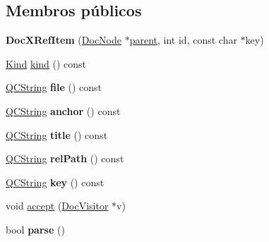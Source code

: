 \subsection*{Membros públicos}
\begin{DoxyCompactItemize}
\item 
\hypertarget{class_doc_x_ref_item_a96fb92409830e0b3557d44ecea952457}{{\bfseries Doc\-X\-Ref\-Item} (\hyperlink{class_doc_node}{Doc\-Node} $\ast$\hyperlink{class_doc_node_abd7f070d6b0a38b4da71c2806578d19d}{parent}, int id, const char $\ast$key)}\label{class_doc_x_ref_item_a96fb92409830e0b3557d44ecea952457}

\item 
\hyperlink{class_doc_node_aa10c9e8951b8ccf714a59ec321bdac5b}{Kind} \hyperlink{class_doc_x_ref_item_aa9d037bed9f9a083d0cd01485637d843}{kind} () const 
\item 
\hypertarget{class_doc_x_ref_item_aeaa8cdb0fbabc1058b7d3813f2fd223b}{\hyperlink{class_q_c_string}{Q\-C\-String} {\bfseries file} () const }\label{class_doc_x_ref_item_aeaa8cdb0fbabc1058b7d3813f2fd223b}

\item 
\hypertarget{class_doc_x_ref_item_acd17ae1d9600f864b1beb85dfb99a4f4}{\hyperlink{class_q_c_string}{Q\-C\-String} {\bfseries anchor} () const }\label{class_doc_x_ref_item_acd17ae1d9600f864b1beb85dfb99a4f4}

\item 
\hypertarget{class_doc_x_ref_item_adf5241b59706e696c508de8baa4c2f97}{\hyperlink{class_q_c_string}{Q\-C\-String} {\bfseries title} () const }\label{class_doc_x_ref_item_adf5241b59706e696c508de8baa4c2f97}

\item 
\hypertarget{class_doc_x_ref_item_a3aa6799d4713d51d9cc4862af165671c}{\hyperlink{class_q_c_string}{Q\-C\-String} {\bfseries rel\-Path} () const }\label{class_doc_x_ref_item_a3aa6799d4713d51d9cc4862af165671c}

\item 
\hypertarget{class_doc_x_ref_item_a9e2cde000c58bff4b99b36c60a972d88}{\hyperlink{class_q_c_string}{Q\-C\-String} {\bfseries key} () const }\label{class_doc_x_ref_item_a9e2cde000c58bff4b99b36c60a972d88}

\item 
void \hyperlink{class_doc_x_ref_item_a7ba716e854ae2f8f87a4eb2140e302b6}{accept} (\hyperlink{class_doc_visitor}{Doc\-Visitor} $\ast$v)
\item 
\hypertarget{class_doc_x_ref_item_a1e17a5c9f8b518e6aea8ba0adb9113c4}{bool {\bfseries parse} ()}\label{class_doc_x_ref_item_a1e17a5c9f8b518e6aea8ba0adb9113c4}

\end{DoxyCompactItemize}
